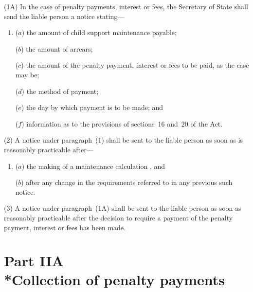\documentclass[12pt,a4paper]{article}
\begin{document}
(1A) In the case of penalty payments, interest or fees, the Secretary of State shall send the liable person a notice stating—
\begin{enumerate}\item[]
($a$) the amount of child support maintenance payable;

($b$) the amount of arrears;

($c$) the amount of the penalty payment, interest or fees to be paid, as the case may be;

($d$) the method of payment;

($e$) the day by which payment is to be made; and

($f$) information as to the provisions of sections~16 and~20 of the Act.
\end{enumerate}

(2) A notice under paragraph~(1) shall be sent to the liable person as soon as is reasonably practicable after—
\begin{enumerate}\item[]
($a$) the making of a maintenance 
calculation%
, and

($b$) after any change in the requirements referred to in any previous such notice.
\end{enumerate}

(3) A notice under paragraph~(1A) shall be sent to the liable person as soon as reasonably practicable after the decision to require a payment of the penalty payment, interest or fees has been made.


\section[Part IIA --- Collection of penalty payments]{Part IIA\\*Collection of penalty payments}

\renewcommand\parthead{--- Part IIA}
\end{document}
